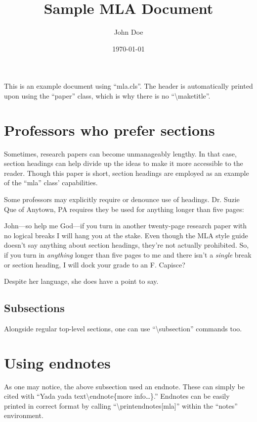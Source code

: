 \documentclass[mla8]{mla}
\title{Sample MLA Document}
\author{John Doe}
\date{\today}
\begin{document}
\begin{paper}

This is an example document using ``mla.cls''.
The header is automatically printed upon using the ``paper'' class,
which is why there is no ``\textbackslash{}maketitle''.

\section{Professors who prefer sections}

Sometimes, research papers can become unmanageably lengthy.
In that case, section headings can help divide up the ideas
to make it more accessible to the reader.
Though this paper is short, section headings are employed
as an example of the ``mla'' class' capabilities.

Some professors may explicitly require or denounce use of headings.
Dr. Suzie Que of Anytown, PA requires they be used for anything
longer than five pages:
\begin{blockquote}
John---so help me God---if you turn in another twenty-page research
paper with no logical breaks I will hang you at the stake.
Even though the MLA style guide doesn't say anything about
section headings, they're not actually prohibited.
So, if you turn in \emph{anything} longer than five pages to me
and there isn't a \emph{single} break or section heading,
I will dock your grade to an F.
Capisce? \cite{que2019}
\end{blockquote}
Despite her language, she does have a point to say.

\subsection{Subsections}

Alongside regular top-level sections, one can use
``\textbackslash{}subsection'' commands too.

\section{Using endnotes}

As one may notice, the above subsection used an endnote.
These can simply be cited with
``Yada yada text\textbackslash{}endnote\{more info\ldots\}.''
Endnotes can be easily printed in correct format by calling
``\textbackslash{}printendnotes[mla]'' within the
``notes'' environment.


\end{paper}
\end{document}
